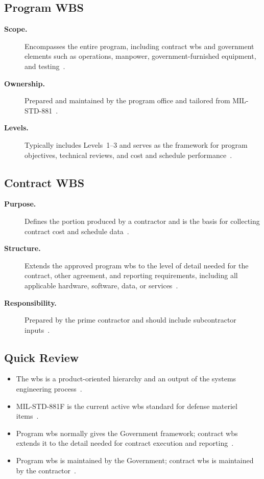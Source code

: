 \documentclass[../main.tex]{subfiles}
\begin{document}
\subsection{Program WBS}
\begin{description}
  \item[\textbf{Scope.}] Encompasses the entire program, including contract \ac{wbs} and government elements such as operations, manpower, government-furnished equipment, and testing~\autocite{edo-3-5-2-wbs-2025}.
  \item[\textbf{Ownership.}] Prepared and maintained by the program office and tailored from MIL-STD-881~\autocite{edo-3-5-2-wbs-2025}.
  \item[\textbf{Levels.}] Typically includes Levels~1--3 and serves as the framework for program objectives, technical reviews, and cost and schedule performance~\autocite{edo-3-5-2-wbs-2025}.
\end{description}

\subsection{Contract WBS}
\begin{description}
  \item[\textbf{Purpose.}] Defines the portion produced by a contractor and is the basis for collecting contract cost and schedule data~\autocite{edo-3-5-2-wbs-2025}.
  \item[\textbf{Structure.}] Extends the approved program \ac{wbs} to the level of detail needed for the contract, other agreement, and reporting requirements, including all applicable hardware, software, data, or services~\autocite{edo-3-5-2-wbs-2025,MILSTD-881F}.
  \item[\textbf{Responsibility.}] Prepared by the prime contractor and should include subcontractor inputs~\autocite{edo-3-5-2-wbs-2025}.
\end{description}

\subsection{Quick Review}
\begin{itemize}
  \item The \ac{wbs} is a product-oriented hierarchy and an output of the systems engineering process~\autocite{edo-3-5-2-wbs-2025}.
  \item MIL-STD-881F is the current active \ac{wbs} standard for defense materiel items~\autocite{MILSTD-881F}.
  \item Program \ac{wbs} normally gives the Government framework; contract \ac{wbs} extends it to the detail needed for contract execution and reporting~\autocite{edo-3-5-2-wbs-2025,MILSTD-881F}.
  \item Program \ac{wbs} is maintained by the Government; contract \ac{wbs} is maintained by the contractor~\autocite{edo-3-5-2-wbs-2025}.
\end{itemize}
\end{document}
